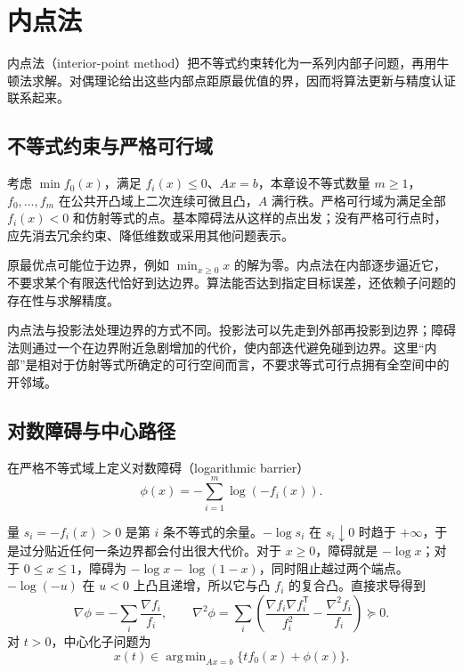 \setcounter{chapter}{10} %
\chapter{内点法}
\label{ch:co-interior}

内点法（interior-point method）把不等式约束转化为一系列内部子问题，再用牛顿法求解。对偶理论给出这些内部点距原最优值的界，因而将算法更新与精度认证联系起来。

\section{不等式约束与严格可行域}

考虑 $\min f_0(x)$，满足 $f_i(x)\leq0$、$Ax=b$，本章设不等式数量 $m\geq1$，$f_0,\ldots,f_m$ 在公共开凸域上二次连续可微且凸，$A$ 满行秩。严格可行域为满足全部 $f_i(x)<0$ 和仿射等式的点。基本障碍法从这样的点出发；没有严格可行点时，应先消去冗余约束、降低维数或采用其他问题表示。

原最优点可能位于边界，例如 $\min_{x\geq0}x$ 的解为零。内点法在内部逐步逼近它，不要求某个有限迭代恰好到达边界。算法能否达到指定目标误差，还依赖子问题的存在性与求解精度。

内点法与投影法处理边界的方式不同。投影法可以先走到外部再投影到边界；障碍法则通过一个在边界附近急剧增加的代价，使内部迭代避免碰到边界。这里“内部”是相对于仿射等式所确定的可行空间而言，不要求等式可行点拥有全空间中的开邻域。

\section{对数障碍与中心路径}

在严格不等式域上定义对数障碍（logarithmic barrier）
\[
 \phi(x)=-\sum_{i=1}^m\log(-f_i(x)).
\]

量 $s_i=-f_i(x)>0$ 是第 $i$ 条不等式的余量。$-\log s_i$ 在 $s_i\downarrow0$ 时趋于 $+\infty$，于是过分贴近任何一条边界都会付出很大代价。对于 $x\geq0$，障碍就是 $-\log x$；对于 $0\leq x\leq1$，障碍为 $-\log x-\log(1-x)$，同时阻止越过两个端点。
$-\log(-u)$ 在 $u<0$ 上凸且递增，所以它与凸 $f_i$ 的复合凸。直接求导得到
\[
 \nabla\phi=-\sum_i\frac{\nabla f_i}{f_i},\qquad
 \nabla^2\phi=\sum_i\left(\frac{\nabla f_i\nabla f_i^{\mathsf T}}{f_i^2}
                         -\frac{\nabla^2f_i}{f_i}\right)\succeq0.
\]
对 $t>0$，中心化子问题为
\begin{equation}
 x(t)\in\mathop{\mathrm{arg\,min}}_{Ax=b}\{t f_0(x)+\phi(x)\}.
 \label{eq:co-central-path}
\end{equation}

